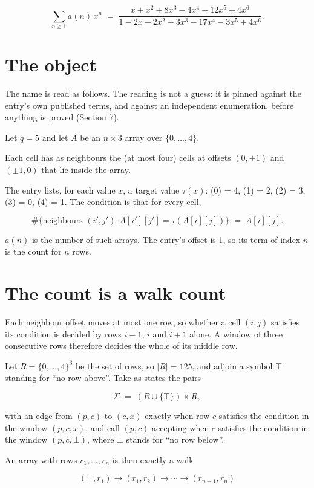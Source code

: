 \documentclass[11pt]{article}
\theoremstyle{definition}
\begin{document}
\[\sum_{n \ge 1} a(n)\,x^n \;=\; \frac{x + x^{2} + 8x^{3} - 4x^{4} - 12x^{5} + 4x^{6}}{1 - 2x - 2x^{2} - 3x^{3} - 17x^{4} - 3x^{5} + 4x^{6}}.\]

\section{The object}

The name is read as follows. The reading is not a guess: it is pinned against the entry's own published terms, and against an independent enumeration, before anything is proved (Section 7).

Let $q = 5$ and let $A$ be an $n \times 3$ array over $\{0,\dots,4\}$.

Each cell has as neighbours the (at most four) cells at offsets $(0,\pm1)$ and $(\pm1,0)$ that lie inside the array.

The entry lists, for each value $x$, a target value $\tau(x)$: \tau(0) = 4, \tau(1) = 2, \tau(2) = 3, \tau(3) = 0, \tau(4) = 1. The condition is that for every cell,

\[\#\{\text{neighbours } (i',j') : A[i'][j'] = \tau(A[i][j])\} \;=\; A[i][j].\]

$a(n)$ is the number of such arrays. The entry's offset is 1, so its term of index $n$ is the count for $n$ rows.

\section{The count is a walk count}

Each neighbour offset moves at most one row, so whether a cell $(i,j)$ satisfies its condition is decided by rows $i-1$, $i$ and $i+1$ alone. A window of three consecutive rows therefore decides the whole of its middle row.

Let $R = \{0,\dots,4\}^{3}$ be the set of rows, so $|R| = 125$, and adjoin a symbol $\top$ standing for ``no row above''. Take as states the pairs

\[\Sigma \;=\; (R \cup \{\top\}) \times R,\]

with an edge from $(p,c)$ to $(c,x)$ exactly when row $c$ satisfies the condition in the window $(p,c,x)$, and call $(p,c)$ accepting when $c$ satisfies the condition in the window $(p,c,\bot)$, where $\bot$ stands for ``no row below''.

An array with rows $r_1,\dots,r_n$ is then exactly a walk

\[(\top,r_1) \to (r_1,r_2) \to \cdots \to (r_{n-1},r_n)\]
\end{document}
